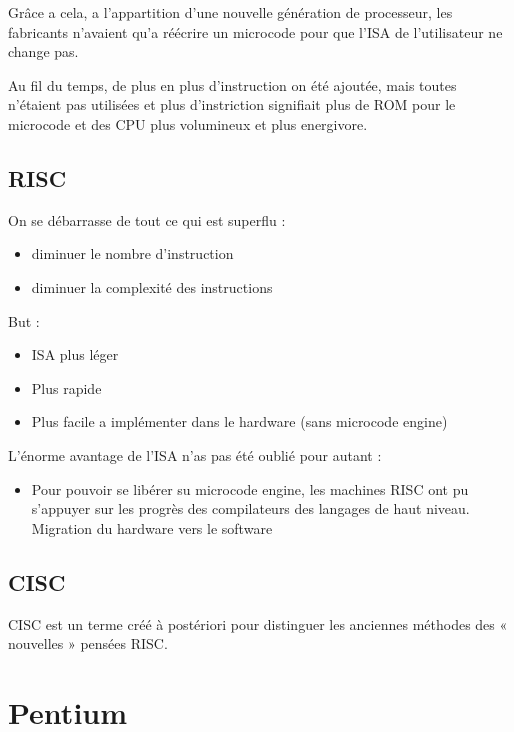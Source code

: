 \documentclass[a4paper]{article}
\begin{document}
  Grâce a cela, a l'appartition d'une nouvelle génération de processeur, les fabricants n'avaient qu'a réécrire un microcode pour que l'ISA de l'utilisateur ne change pas.

  Au fil du temps, de plus en plus d'instruction on été ajoutée, mais toutes n'étaient pas utilisées et plus d'instriction 
  signifiait plus de ROM pour le microcode et des CPU plus volumineux et plus energivore.

  \subsection{RISC}
    On se débarrasse de tout ce qui est superflu :
    \begin{itemize}
      \item diminuer le nombre d'instruction
      \item diminuer la complexité des instructions
    \end{itemize}
    But :
    \begin{itemize}
      \item ISA plus léger
      \item Plus rapide
      \item Plus facile a implémenter dans le hardware (sans microcode engine)
    \end{itemize}

    L'énorme avantage de l'ISA n'as pas été oublié pour autant :
    \begin{itemize}
      \item Pour pouvoir se libérer su microcode engine, les machines RISC ont pu
      s’appuyer sur les progrès des compilateurs des
      langages de haut niveau. Migration du hardware vers le software
    \end{itemize}

  \subsection{CISC}
  CISC est un terme créé à postériori pour distinguer les anciennes méthodes des « nouvelles » pensées RISC.
















  \section{Pentium}
\end{document}
